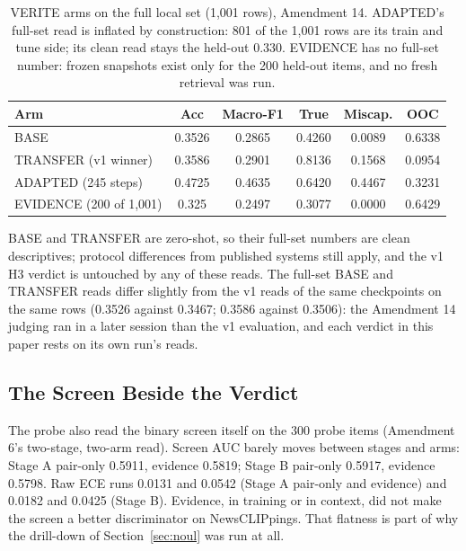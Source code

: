 \documentclass{article} %
\begin{document}
\begin{table}[t]
\centering
\small
\caption{VERITE arms on the full local set (1,001 rows), Amendment 14. ADAPTED's full-set read is inflated by construction: 801 of the 1,001 rows are its train and tune side; its clean read stays the held-out 0.330. EVIDENCE has no full-set number: frozen snapshots exist only for the 200 held-out items, and no fresh retrieval was run.}
\label{tab:veritefull}
\begin{tabular}{lccccc}
\toprule
Arm & Acc & Macro-F1 & True & Miscap. & OOC \\
\midrule
BASE & 0.3526 & 0.2865 & 0.4260 & 0.0089 & 0.6338 \\
TRANSFER (v1 winner) & 0.3586 & 0.2901 & 0.8136 & 0.1568 & 0.0954 \\
ADAPTED (245 steps) & 0.4725 & 0.4635 & 0.6420 & 0.4467 & 0.3231 \\
EVIDENCE (200 of 1,001) & 0.325 & 0.2497 & 0.3077 & 0.0000 & 0.6429 \\
\bottomrule
\end{tabular}
\end{table}

BASE and TRANSFER are zero-shot, so their full-set numbers are clean descriptives; protocol differences from published systems still apply, and the v1 H3 verdict is untouched by any of these reads. The full-set BASE and TRANSFER reads differ slightly from the v1 reads of the same checkpoints on the same rows (0.3526 against 0.3467; 0.3586 against 0.3506): the Amendment 14 judging ran in a later session than the v1 evaluation, and each verdict in this paper rests on its own run's reads.

\subsection{The Screen Beside the Verdict}
The probe also read the binary screen itself on the 300 probe items (Amendment 6's two-stage, two-arm read). Screen AUC barely moves between stages and arms: Stage A pair-only 0.5911, evidence 0.5819; Stage B pair-only 0.5917, evidence 0.5798. Raw ECE runs 0.0131 and 0.0542 (Stage A pair-only and evidence) and 0.0182 and 0.0425 (Stage B). Evidence, in training or in context, did not make the screen a better discriminator on NewsCLIPpings. That flatness is part of why the drill-down of Section~\ref{sec:noul} was run at all.

\end{document}
